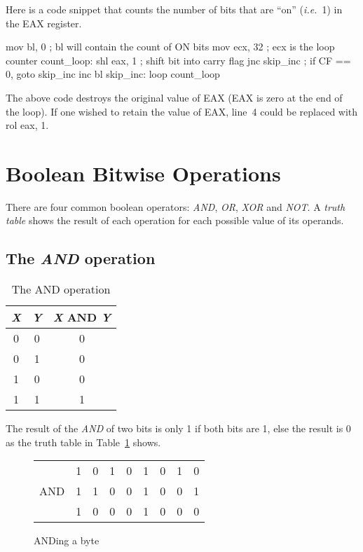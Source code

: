 Here is a code snippet that counts the number of bits that are ``on''
(\emph{i.e.}~1) in the EAX register.
\begin{AsmCodeListing}
      mov    bl, 0           ; bl will contain the count of ON bits
      mov    ecx, 32         ; ecx is the loop counter
count_loop:
      shl    eax, 1          ; shift bit into carry flag
      jnc    skip_inc        ; if CF == 0, goto skip_inc
      inc    bl
skip_inc:
      loop   count_loop
\end{AsmCodeListing}
The above code destroys the original value of {\code EAX} ({\code EAX} is zero
at the end of the loop). If one wished to retain the value of {\code EAX},
line~4 could be replaced with {\code rol  eax, 1}.

\section{Boolean Bitwise Operations}

There are four common boolean operators: \emph{AND}, \emph{OR}, \emph{XOR} and
\emph{NOT}. A \emph{truth table} shows the result of each operation for each
possible value of its operands.

\subsection{The \emph{AND} operation}

\begin{table}[t]
\centering
\begin{tabular}{|c|c|c|}
\hline
\emph{X} & \emph{Y} & \emph{X} AND \emph{Y} \\
\hline \hline
0 & 0 & 0 \\
0 & 1 & 0 \\
1 & 0 & 0 \\
1 & 1 & 1 \\
\hline
\end{tabular}
\caption{The AND operation \label{tab:and} }
\end{table}

The result of the \emph{AND} of two bits is only 1 if both bits are 1, else
the result is 0 as the truth table in Table~\ref{tab:and} shows.

\begin{figure}[t]
\centering
\begin{tabular}{rcccccccc}
    & 1 & 0 & 1 & 0 & 1 & 0 & 1 & 0 \\
AND & 1 & 1 & 0 & 0 & 1 & 0 & 0 & 1 \\
\hline
    & 1 & 0 & 0 & 0 & 1 & 0 & 0 & 0
\end{tabular}
\caption{ANDing a byte \label{fig:and}}
\end{figure}


